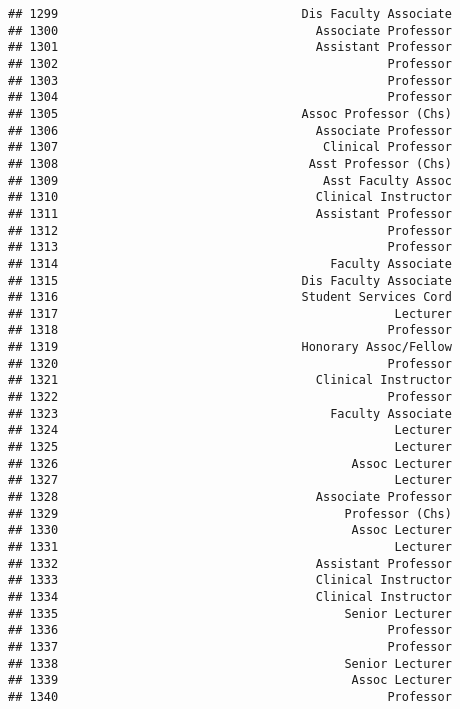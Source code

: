 \documentclass[
]{article}
\begin{document}
\begin{verbatim}
## 1299                                  Dis Faculty Associate
## 1300                                    Associate Professor
## 1301                                    Assistant Professor
## 1302                                              Professor
## 1303                                              Professor
## 1304                                              Professor
## 1305                                  Assoc Professor (Chs)
## 1306                                    Associate Professor
## 1307                                     Clinical Professor
## 1308                                   Asst Professor (Chs)
## 1309                                     Asst Faculty Assoc
## 1310                                    Clinical Instructor
## 1311                                    Assistant Professor
## 1312                                              Professor
## 1313                                              Professor
## 1314                                      Faculty Associate
## 1315                                  Dis Faculty Associate
## 1316                                  Student Services Cord
## 1317                                               Lecturer
## 1318                                              Professor
## 1319                                  Honorary Assoc/Fellow
## 1320                                              Professor
## 1321                                    Clinical Instructor
## 1322                                              Professor
## 1323                                      Faculty Associate
## 1324                                               Lecturer
## 1325                                               Lecturer
## 1326                                         Assoc Lecturer
## 1327                                               Lecturer
## 1328                                    Associate Professor
## 1329                                        Professor (Chs)
## 1330                                         Assoc Lecturer
## 1331                                               Lecturer
## 1332                                    Assistant Professor
## 1333                                    Clinical Instructor
## 1334                                    Clinical Instructor
## 1335                                        Senior Lecturer
## 1336                                              Professor
## 1337                                              Professor
## 1338                                        Senior Lecturer
## 1339                                         Assoc Lecturer
## 1340                                              Professor

\end{verbatim}
\end{document}
